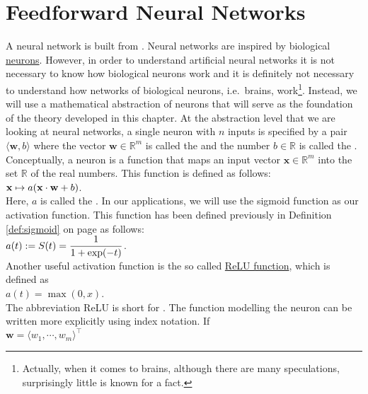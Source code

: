 \section{Feedforward Neural Networks}
A neural network is built from .  Neural networks are inspired by biological 
\href{https://en.wikipedia.org/wiki/Neuron}{neurons}.  However, in order to understand artificial neural
networks it is not necessary to know how biological neurons work and it is definitely not necessary to
understand how networks of biological neurons, i.e.~brains, work\footnote{
  Actually, when it comes to brains, although there are many speculations, surprisingly little is known for a fact.  
}.  
Instead, we will use a mathematical abstraction of neurons that will serve as the foundation of the theory
developed in this chapter.  At the abstraction level that we are looking at neural networks, a single neuron
with $n$ inputs is specified by a pair $\langle \mathbf{w}, b\rangle$ where the vector $\mathbf{w} \in \mathbb{R}^m$ is called the  and 
the number $b \in \mathbb{R}$ is called the .   
Conceptually, a neuron is a function that maps an input vector $\mathbf{x} \in \mathbb{R}^m$ into the set
$\mathbb{R}$ of the real numbers.  This function is defined as follows: 
\\[0.2cm]
\hspace*{1.3cm}
$\displaystyle \mathbf{x} \mapsto a(\mathbf{x} \cdot \mathbf{w} + b)$.
\\[0.2cm]
Here, $a$ is called the .  In our applications, we will use the sigmoid
function as our activation function.  This function has been defined previously in Definition \ref{def:sigmoid}
on page \pageref{def:sigmoid} as follows:
\\[0.2cm]
\hspace*{1.3cm}
$\displaystyle a(t) := S(t) = \frac{1}{1 + \exp(-t)}$.
\\[0.2cm]
Another useful activation function is the so called
\href{https://en.wikipedia.org/wiki/Rectifier_(neural_networks)}{ReLU function}, which is defined as 
\\[0.2cm]
\hspace*{1.3cm}
$a(t) = \max(0, x)$.
\\[0.2cm]
The abbreviation ReLU is short for .
The function modelling the neuron can be written more explicitly using index notation.  If
\\[0.2cm]
\hspace*{1.3cm}
$\mathbf{w} = \langle w_1, \cdots, w_m \rangle^\top$ 
